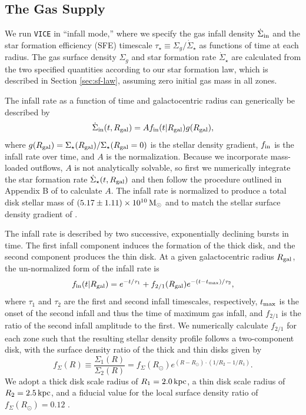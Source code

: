 \documentclass[twocolumn,twocolappendix,linenumbers]{aastex631}
\newcommand{\kpc}{\,{\rm kpc}}
\begin{document}
\subsection{The Gas Supply}
\label{sec:sfh}

We run {\tt VICE} in ``infall mode,'' where we specify the gas infall density $\dot\Sigma_{\rm in}$ and the star formation efficiency (SFE) timescale $\tau_\star\equiv \Sigma_g / \dot\Sigma_\star$ as functions of time at each radius. The gas surface density $\Sigma_g$ and star formation rate $\dot\Sigma_\star$ are calculated from the two specified quantities according to our star formation law, which is described in Section \ref{sec:sf-law}, assuming zero initial gas mass in all zones.

The infall rate as a function of time and galactocentric radius can generically be described by
\begin{equation}
    \label{eq:infall-rate}
    \dot\Sigma_{\rm in}(t,R_{\rm gal}) = A f_{\rm in}(t|R_{\rm gal}) g(R_{\rm gal}),
\end{equation}
where $g(R_{\rm gal})=\Sigma_\star(R_{\rm gal}) / \Sigma_\star(R_{\rm gal}=0)$ is the stellar density gradient, $f_{\rm in}$ is the infall rate over time, and $A$ is the normalization. Because we incorporate mass-loaded outflows, $A$ is not analytically solvable, so first we numerically integrate the star formation rate $\dot\Sigma_\star(t,R_{\rm gal})$ and then follow the procedure outlined in Appendix B of \citet{johnson_stellar_2021} to calculate $A$. The infall rate is normalized to produce a total disk stellar mass of $(5.17\pm1.11)\times 10^{10}\,{\rm M}_\odot$ \citep{licquia_improved_2015} and to match the stellar surface density gradient of \citet{bland-hawthorn_galaxy_2016}.

The infall rate is described by two successive, exponentially declining bursts in time. The first infall component induces the formation of the thick disk, and the second component produces the thin disk. At a given galactocentric radius $R_{\rm gal}$, the un-normalized form of the infall rate is
\begin{equation}
    \label{eq:twoinfall-ifr}
    f_{\rm in}(t|R_{\rm gal}) = e^{-t/\tau_1} + f_{2/1}(R_{\rm gal}) e^{-(t-t_{\rm max})/\tau_2},
\end{equation}
where $\tau_1$ and $\tau_2$ are the first and second infall timescales, respectively, $t_{\rm max}$ is the onset of the second infall and thus the time of maximum gas infall, and $f_{2/1}$ is the ratio of the second infall amplitude to the first. We numerically calculate $f_{2/1}$ for each zone such that the resulting stellar density profile follows a two-component disk, with the surface density ratio of the thick and thin disks given by
\begin{equation}
    f_\Sigma(R) \equiv \frac{\Sigma_1(R)}{\Sigma_2(R)} = f_\Sigma(R_\odot) e^{(R-R_\odot)\cdot(1/R_2 - 1/R_1)}.
\end{equation}
We adopt a thick disk scale radius of $R_1=2.0\kpc$, a thin disk scale radius of $R_2=2.5\kpc$, and a fiducial value for the local surface density ratio of $f_\Sigma(R_\odot)=0.12$ \citep{bland-hawthorn_galaxy_2016}. 
\end{document}
